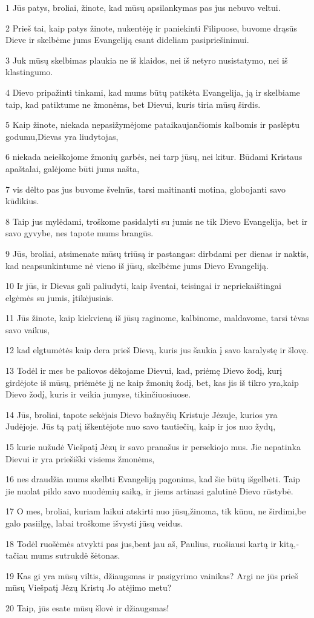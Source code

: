 \par 1 Jūs patys, broliai, žinote, kad mūsų apsilankymas pas jus nebuvo veltui. 
\par 2 Prieš tai, kaip patys žinote, nukentėję ir paniekinti Filipuose, buvome drąsūs Dieve ir skelbėme jums Evangeliją esant dideliam pasipriešinimui. 
\par 3 Juk mūsų skelbimas plaukia ne iš klaidos, nei iš netyro nusistatymo, nei iš klastingumo. 
\par 4 Dievo pripažinti tinkami, kad mums būtų patikėta Evangelija, ją ir skelbiame taip, kad patiktume ne žmonėms, bet Dievui, kuris tiria mūsų širdis. 
\par 5 Kaip žinote, niekada nepasižymėjome pataikaujančiomis kalbomis ir paslėptu godumu,­Dievas yra liudytojas,­ 
\par 6 niekada neieškojome žmonių garbės, nei tarp jūsų, nei kitur. Būdami Kristaus apaštalai, galėjome būti jums našta, 
\par 7 vis dėlto pas jus buvome švelnūs, tarsi maitinanti motina, globojanti savo kūdikius. 
\par 8 Taip jus mylėdami, troškome pasidalyti su jumis ne tik Dievo Evangelija, bet ir savo gyvybe, nes tapote mums brangūs. 
\par 9 Jūs, broliai, atsimenate mūsų triūsą ir pastangas: dirbdami per dienas ir naktis, kad neapsunkintume nė vieno iš jūsų, skelbėme jums Dievo Evangeliją. 
\par 10 Ir jūs, ir Dievas gali paliudyti, kaip šventai, teisingai ir nepriekaištingai elgėmės su jumis, įtikėjusiais. 
\par 11 Jūs žinote, kaip kiekvieną iš jūsų raginome, kalbinome, maldavome, tarsi tėvas savo vaikus, 
\par 12 kad elgtumėtės kaip dera prieš Dievą, kuris jus šaukia į savo karalystę ir šlovę. 
\par 13 Todėl ir mes be paliovos dėkojame Dievui, kad, priėmę Dievo žodį, kurį girdėjote iš mūsų, priėmėte jį ne kaip žmonių žodį, bet, kas jis iš tikro yra,­kaip Dievo žodį, kuris ir veikia jumyse, tikinčiuosiuose. 
\par 14 Jūs, broliai, tapote sekėjais Dievo bažnyčių Kristuje Jėzuje, kurios yra Judėjoje. Jūs tą patį iškentėjote nuo savo tautiečių, kaip ir jos nuo žydų, 
\par 15 kurie nužudė Viešpatį Jėzų ir savo pranašus ir persekiojo mus. Jie nepatinka Dievui ir yra priešiški visiems žmonėms, 
\par 16 nes draudžia mums skelbti Evangeliją pagonims, kad šie būtų išgelbėti. Taip jie nuolat pildo savo nuodėmių saiką, ir jiems artinasi galutinė Dievo rūstybė. 
\par 17 O mes, broliai, kuriam laikui atskirti nuo jūsų,­žinoma, tik kūnu, ne širdimi,­be galo pasiilgę, labai troškome išvysti jūsų veidus. 
\par 18 Todėl ruošėmės atvykti pas jus,­bent jau aš, Paulius, ruošiausi kartą ir kitą,­tačiau mums sutrukdė šėtonas. 
\par 19 Kas gi yra mūsų viltis, džiaugsmas ir pasigyrimo vainikas? Argi ne jūs prieš mūsų Viešpatį Jėzų Kristų Jo atėjimo metu? 
\par 20 Taip, jūs esate mūsų šlovė ir džiaugsmas!


